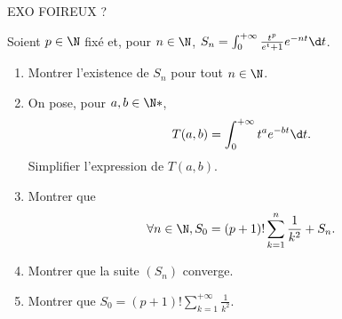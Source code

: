 \begin{enonce}
  \glissant EXO FOIREUX ?
\begin{exercise}[ID={RMS126 E869},subtitle={CCP MP 2015},tags={}]
Soient $p\in\N$ fixé et, pour $n\in\N$, $S_n=\int_0^{+\infty} \frac{t^p}{e^t + 1} e^{-nt}\d t$.
\begin{enumerate}
  \item Montrer l'existence de $S_n$ pour tout $n\in\N$.
  \item On pose, pour $a,b\in\N*$,
    \begin{equation*}
      T(a,b)=\int_0^{+\infty} t^a e^{-bt}\d t.
    \end{equation*}
    Simplifier l'expression de $T(a,b)$.

  \item Montrer que
    \begin{equation*}
      \forall n\in\N, S_0 = (p+1)! \sum_{k=1}^{n} \frac1{k^2} + S_n.
    \end{equation*}

  \item Montrer que la suite $\left( S_n \right)$ converge.

  \item Montrer que $S_0  = (p+1)! \sum_{k=1}^{+\infty}\frac1{k^2}$.
\end{enumerate}
\end{exercise}
\begin{solution}
\end{solution}
\end{enonce}
